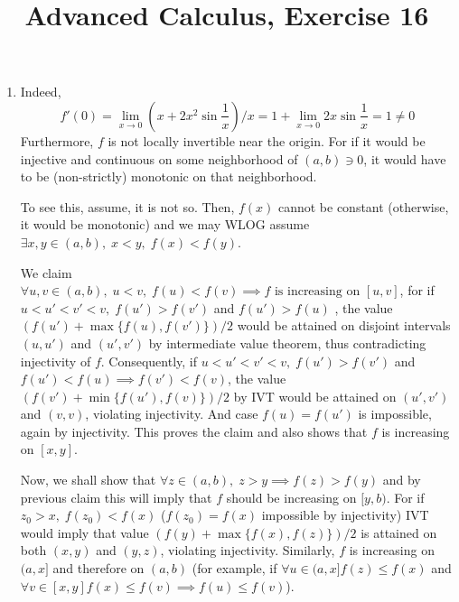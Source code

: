 \documentclass[8pt]{article} %
\title{Advanced Calculus, Exercise 16}
\author{}
\begin{document}
\maketitle
\begin{enumerate}
	\item{Indeed,\[f'(0)=\lim_{x\to0}\left(x+2x^2\sin\frac{1}{x}\right)/x=1+\lim_{x\to0}2x\sin\frac{1}{x}=1\neq 0\]
		Furthermore, $f$ is not locally invertible near the origin. For if it would be injective and continuous on some neighborhood of $(a,b)\ni0$,
		it would have to be (non-strictly) monotonic on that neighborhood. 
		
		To see this, assume, it is not so. Then, $f(x)$ cannot be constant
		(otherwise, it would be monotonic) and we may WLOG assume $\exists x,y\in (a,b),\;x<y,\;f(x)<f(y)$. 
		
		We claim $\forall u,v\in (a,b),\;u<v,\; f(u)<f(v)\implies f
		\text{ is increasing on } [u,v]$, for if $u<u'<v'<v,\;f(u')>f(v')$ and $f(u')>f(u)$
		, the value $\left(f(u')+\max\{f(u),f(v')\}\right)/2$ would be attained on disjoint intervals
		$(u,u')$ and $(u',v')$ by intermediate value theorem,
		thus contradicting injectivity of $f$. Consequently, if $u<u'<v'<v,\;f(u')>f(v')$ and $f(u')<f(u)\implies f(v')<f(v)$,
		the value $\left(f(v')+\min\{f(u'),f(v)\}\right)/2$ by IVT would be attained on $(u',v')$ and $(v,v)$, violating injectivity. And case $f(u)=f(u')$ is
		impossible, again by injectivity. This proves the claim and also shows that $f$ is increasing on $[x,y]$.

		Now, we shall show that $\forall z\in(a,b),\; z>y\implies f(z)>f(y)$ and by previous claim this will imply that $f$ should be increasing on $[y,b)$. For
		if $z_0>x,\;f(z_0)<f(x)$ ($f(z_0)=f(x)$ impossible by injectivity) IVT would imply that
		value $\left(f(y)+\max\{f(x),f(z)\}\right)/2$ is attained on both $(x,y)$ and $(y,z)$, violating injectivity. Similarly, $f$ is increasing on $(a,x]$ and
		therefore on $(a,b)$ (for example, if $\forall u\in(a,x] f(z)\leq f(x)$ and $\forall v\in [x,y] f(x)\leq f(v)\implies f(u)\leq f(v)$).

}
\end{enumerate}
\end{document}
